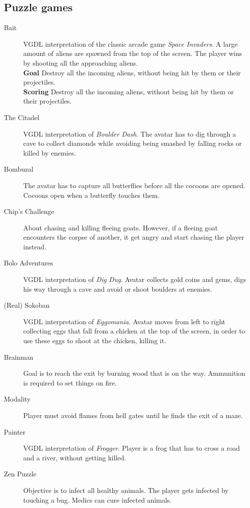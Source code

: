 \documentclass[a4paper,titlepage,final, twoside]{report}
\begin{document}
\begin{appendices}
\section{Puzzle games}

\begin{description}
\item [Bait] VGDL interpretation of the classic arcade game \emph{Space Invaders}. A large amount of aliens are spawned from the top of the screen. The player wins by shooting all the approaching aliens.\\
\textbf{Goal} Destroy all the incoming aliens, without being hit by them or their projectiles.\\
\textbf{Scoring} Destroy all the incoming aliens, without being hit by them or their projectiles.
\item [The Citadel] VGDL interpretation of \emph{Boulder Dash}. The avatar has to dig through a cave to collect diamonds while avoiding being smashed by falling rocks or killed by enemies. 
\item [Bombuzal] The avatar has to capture all butterflies before all the cocoons are opened. Cocoons open when a butterfly touches them.
\item [Chip's Challenge] About chasing and killing fleeing goats. However, if a fleeing goat encounters the corpse of another, it get angry and start chasing the player instead.
\item [Bolo Adventures] VGDL interpretation of \emph{Dig Dug}. Avatar collects gold coins and gems, digs his way through a cave and avoid or shoot boulders at enemies.
\item [(Real) Sokoban] VGDL interpretation of \emph{Eggomania}. Avatar moves from left to right collecting eggs that fall from a chicken at the top of the screen, in order to use these eggs to shoot at the chicken, killing it.
\item [Brainman] Goal is to reach the exit by burning wood that is on the way. Ammunition is required to set things on fire.
\item [Modality] Player must avoid flames from hell gates until he finds the exit of a maze.
\item [Painter] VGDL interpretation of \emph{Frogger}. Player is a frog that has to cross a road and a river, without getting killed.
\item [Zen Puzzle] Objective is to infect all healthy animals. The player gets infected by touching a bug. Medics can cure infected animals.
\end{description}

\end{appendices}





\newpage
\appendix
\end{document}
